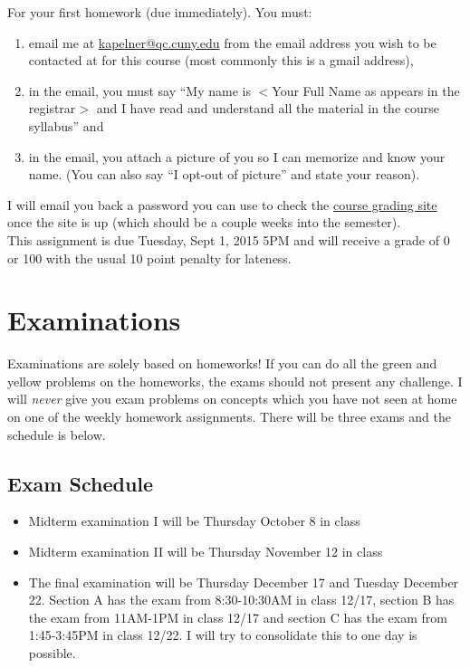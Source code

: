 \documentclass[12pt]{article}
\newcommand{\qu}[1]{``#1''}
\begin{document}
For your first homework (due immediately). You must:

\begin{enumerate}[(1)]
\item email me at \href{kapelner@qc.cuny.edu}{kapelner@qc.cuny.edu} from the email address you wish to be contacted at for this course (most commonly this is a gmail address),
\item in the email, you must say \qu{My name is $<$Your Full Name as appears in the registrar$>$ and I have read and understand all the material in the course syllabus} and
\item in the email, you attach a picture of you so I can memorize and know your name. (You can also say \qu{I opt-out of picture} and state your reason).
\end{enumerate}

I will email you back a password you can use to check the \href{http://gradesly.com}{course grading site} once the site is up (which should be a couple weeks into the semester). \\

This assignment is due Tuesday, Sept 1, 2015 5PM and will receive a grade of 0 or 100 with the usual 10 point penalty for lateness.


\section*{Examinations}

Examinations are solely based on homeworks! If you can do all the green and yellow problems on the homeworks, the exams should not present any challenge. I will \textit{never} give you exam problems on concepts which you have not seen at home on one of the weekly homework assignments. There will be three exams and the schedule is below.

\subsection*{Exam Schedule}\label{subsec:exam_schedule}

\begin{itemize}
\itemsep -0.0em 
\item Midterm examination I will be Thursday October 8 in class
\item Midterm examination II will be Thursday November 12 in class
\item The final examination will be Thursday December 17 and Tuesday December 22. Section A has the exam from 8:30-10:30AM in class 12/17, section B has the exam from 11AM-1PM in class 12/17 and section C has the exam from 1:45-3:45PM in class 12/22. I will try to consolidate this to one day is possible.
\end{itemize}
\end{document}
